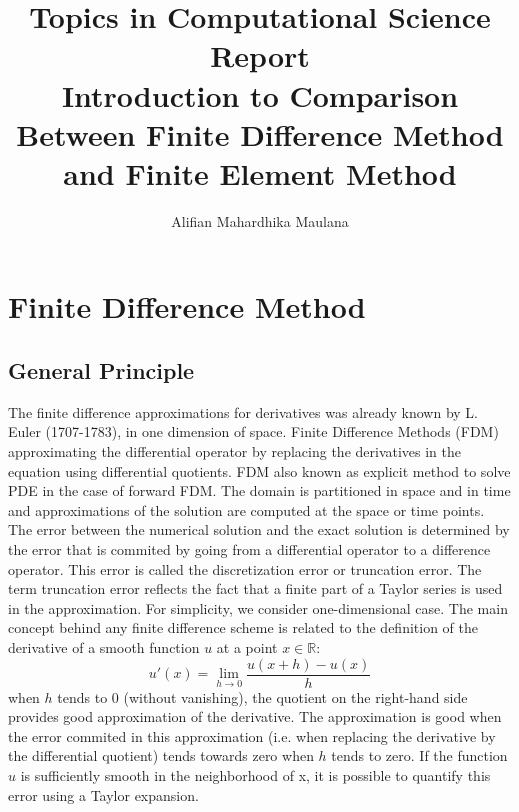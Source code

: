 \documentclass[a4paper,12pt]{article}
\title{Topics in Computational Science Report \\ Introduction to Comparison Between Finite Difference Method and Finite Element Method}
\author{Alifian Mahardhika Maulana}
\newcommand{\R}{\mathbb{R}}
\begin{document}
\maketitle
\section{Finite Difference Method}
\subsection{General Principle}
The finite difference approximations for derivatives was already known by L. Euler (1707-1783), in one dimension of space. Finite Difference Methods (FDM) approximating the differential operator by replacing the derivatives in the equation using differential quotients. FDM also known as explicit method to solve PDE in the case of forward FDM. The domain is partitioned in space and in time and approximations of the solution are computed at the space or time points. The error between the numerical solution and the exact solution is determined by the error that is commited by going from a differential operator to a difference operator. This error is called the discretization error or truncation error. The term truncation error reflects the fact that a finite part of a Taylor series is used in the approximation. For simplicity, we consider one-dimensional case. The main concept behind any finite difference scheme is related to the definition of the derivative of a smooth function $u$ at a point $x\in \R$:
\begin{equation}
u'(x) = \lim_{h\to 0} \frac{u(x+h)-u(x)}{h}
\end{equation}
when $h$ tends to 0 (without vanishing), the quotient on the right-hand side provides good approximation of the derivative. The approximation is good when the error commited in this approximation (i.e. when replacing the derivative by the differential quotient) tends towards zero when $h$ tends to zero. If the function $u$ is sufficiently smooth in the neighborhood of x, it is possible to quantify this error using a Taylor expansion.
\end{document}
